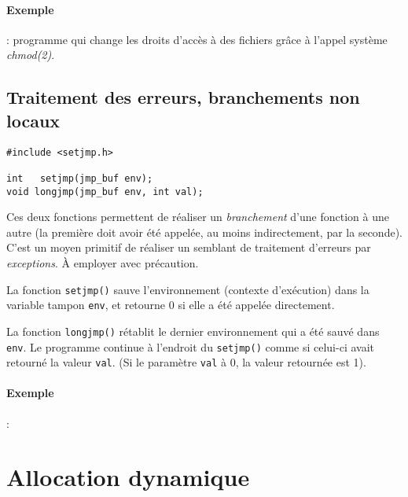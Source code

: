 
\paragraph*{Exemple} : programme qui change les droits d'accès à des fichiers
grâce à l'appel système \emph{chmod(2)}.


\source



\subsection{Traitement des erreurs, branchements non locaux }


\extrait
\begin{lstlisting}
#include <setjmp.h>

int   setjmp(jmp_buf env);
void longjmp(jmp_buf env, int val);
\end{lstlisting}


Ces deux fonctions permettent de réaliser un \emph{branchement} d'une
fonction à une autre (la première doit avoir été appelée, au moins
indirectement, par la seconde). C'est un moyen primitif de réaliser un
semblant de traitement d'erreurs par \emph{exceptions}. À employer
avec précaution.

La fonction \texttt{setjmp()} sauve l'environnement (contexte d'exécution)
dans la variable tampon \texttt{env}, et retourne 0 si elle a été appelée
directement. 

La fonction \texttt{longjmp()} rétablit le dernier environnement qui a
été sauvé dans \texttt{env}. Le programme continue à l'endroit du
\texttt{setjmp()} comme si celui-ci avait retourné la valeur
\texttt{val}.  (Si le paramètre \texttt{val} à 0, la valeur retournée
est 1).

\paragraph*{Exemple} :


\source




\section{Allocation dynamique}

